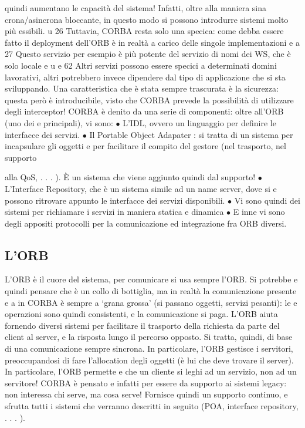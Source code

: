 \documentclass[a4paper,12pt]{article}
\begin{document}
quindi aumentano le capacità del sistema! Infatti, oltre alla maniera sina
crona/asincrona bloccante, in questo modo si possono introdurre sistemi
molto più essibili.
u
26 Tuttavia, CORBA resta solo una specica: come debba essere fatto il deployment
dell'ORB è in realtà a carico delle singole implementazioni
e
a
27 Questo servizio per esempio è più potente del servizio di nomi dei WS, che è solo locale
e u
e
62
Altri servizi possono essere specici a determinati domini lavorativi, altri potrebbero invece dipendere dal tipo di
applicazione che si sta sviluppando.
Una caratteristica che è stata sempre trascurata è la sicurezza: questa però è introducibile, visto che CORBA prevede 
la possibilità di utilizzare degli interceptor!
CORBA è denito da una serie di componenti: oltre all'ORB (uno dei
e
principali), vi sono:
$\bullet$ L'IDL, ovvero un linguaggio per definire le interfacce dei servizi.
$\bullet$ Il Portable Object Adapater : si tratta di un sistema per incapsulare gli
oggetti e per facilitare il compito del gestore (nel trasporto, nel supporto

alla QoS, . . . ). È un sistema che viene aggiunto quindi dal supporto!
$\bullet$ L'Interface Repository, che è un sistema simile ad un name server, dove si
e
possono ritrovare appunto le interfacce dei servizi disponibili.
$\bullet$ Vi sono quindi dei sistemi per richiamare i servizi in maniera statica e
dinamica
$\bullet$ E inne vi sono degli appositi protocolli per la comunicazione ed integrazione fra ORB diversi.
\subsection{L'ORB}
L'ORB è il cuore del sistema, per comunicare si usa sempre l'ORB. Si potrebbe
e
quindi pensare che è un collo di bottiglia, ma in realtà la comunicazione presente
e
a
in CORBA è sempre a {`}grana grossa' (si passano oggetti, servizi pesanti): le
e
operazioni sono quindi consistenti, e la comunicazione si paga. L'ORB aiuta
fornendo diversi sistemi per facilitare il trasporto della richiesta da parte del
client al server, e la risposta lungo il percorso opposto. Si tratta, quindi, di base
di una comunicazione sempre sincrona.
In particolare, l'ORB gestisce i servitori, preoccupandosi di fare l'allocation
degli oggetti (è lui che deve trovare il server). In particolare, l'ORB permette
e
che un cliente si leghi ad un servizio, non ad un servitore! CORBA è pensato
e
infatti per essere da supporto ai sistemi legacy: non interessa chi serve, ma
cosa serve! Fornisce quindi un supporto continuo, e sfrutta tutti i sistemi che
verranno descritti in seguito (POA, interface repository, . . . ).
\end{document}
